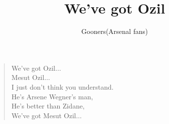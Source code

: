 \documentclass[a4paper,12pt]{article}
\title{We've got Ozil}
\author{Gooners(Arsenal fans)}
\date{}
\begin{document}
	
	\maketitle
	
	\begin{verse}
		
		We've got Ozil$\ldots$ \\
		Mesut Ozil$\ldots$ \\
		I just don't think you understand. \\
		He's Arsene Wegner's man, \\
		He's better than Zidane, \\
		We've got Mesut Ozil$\ldots$
		
	\end{verse}
	
\end{document}
